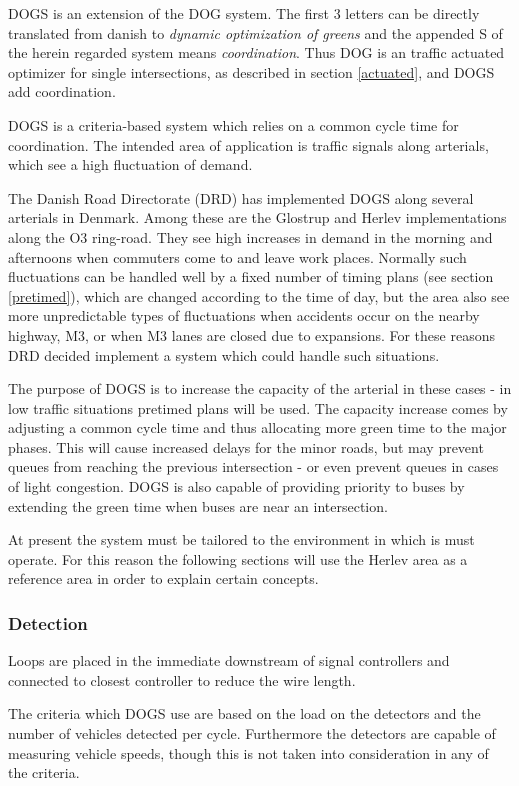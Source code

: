 DOGS is an extension of the DOG system. The first 3 letters can be directly translated from danish to \textit{dynamic optimization of greens} and the appended S of the herein regarded system means \textit{coordination}. Thus DOG is an traffic actuated optimizer for single intersections, as described in section \ref{actuated}, and DOGS add coordination.

DOGS is a criteria-based system which relies on a common cycle time for coordination. The intended area of application is traffic signals along arterials, which see a high fluctuation of demand. 

The Danish Road Directorate (DRD) has implemented DOGS along several arterials in Denmark. 
Among these are the Glostrup and Herlev implementations along the O3 ring-road. They see high increases in demand in the morning and afternoons when commuters come to and leave work places. Normally such fluctuations can be handled well by a fixed number of timing plans (see section \ref{pretimed}), which are changed according to the time of day, but the area also see more unpredictable types of fluctuations when accidents occur on the nearby highway, M3, or when M3 lanes are closed due to expansions. For these reasons DRD decided implement a system which could handle such situations.

The purpose of DOGS is to increase the capacity of the arterial in these cases - in low traffic situations pretimed plans will be used. The capacity increase comes by adjusting a common cycle time and thus allocating more green time to the major phases. This will cause increased delays for the minor roads, but may prevent queues from reaching the previous intersection - or even prevent queues in cases of light congestion.
DOGS is also capable of providing priority to buses by extending the green time when buses are near an intersection.

At present the system must be tailored to the environment in which is must operate. For this reason the following sections will use the Herlev area as a reference area in order to explain certain concepts.

\subsubsection{Detection}
Loops are placed in the immediate downstream of signal controllers and connected to closest controller to reduce the wire length. 

The criteria which DOGS use are based on the load on the detectors and the number of vehicles detected per cycle. Furthermore the detectors are capable of measuring vehicle speeds, though this is not taken into consideration in any of the criteria.

